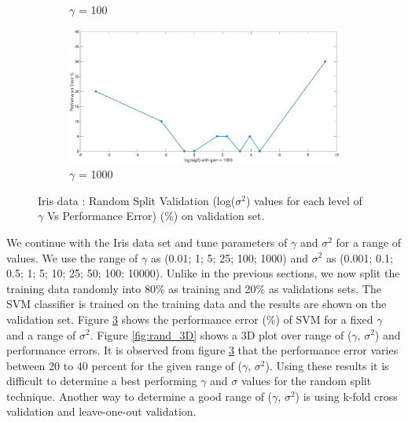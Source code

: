 \documentclass[12pt]{report}
\begin{document}
{\begin{figure}[!ht]
\begin{floatrow}
{\begin{subfigure}{.3\textwidth}
			\caption{$\gamma$ = 100}
			\label{fig:rand_gamma(100)}
		\end{subfigure}%
		\begin{subfigure}{.3\textwidth}
			\includegraphics[height=0.35\linewidth,width=0.7\linewidth]{Ex1.3_gam(1000).eps}
			\caption{$\gamma$ = 1000}
			\label{fig:rand_gamma(1000)}
		\end{subfigure}%
		}{%
			\caption{Iris data : Random Split Validation (log($\sigma^2$) values for each level of $\gamma$ Vs Performance Error)  (\%) on validation set.}\label{fig:rand_gam}
		}
	\end{floatrow}
\end{figure}

We continue with the Iris data set and tune parameters of $\gamma$ and $\sigma^2$ for a range of values. We use the range of $\gamma$ as (0.01; 1; 5; 25; 100; 1000) and $\sigma^2$ as (0.001; 0.1; 0.5; 1; 5; 10; 25; 50; 100; 10000). Unlike in the previous sections, we now split the training data randomly into 80\% as training and 20\% as validations sets. The SVM classifier is trained on the training data and the results are shown on the validation set. Figure \ref{fig:rand_gam}  shows the performance error (\%) of SVM for a fixed $\gamma$ and a range of $\sigma^2$. Figure \ref{fig:rand_3D} shows a 3D plot over range of ($\gamma$, $\sigma^2$) and performance errors. It is observed from figure \ref{fig:rand_gam} that the performance error varies between 20 to 40 percent for the given range of ($\gamma$, $\sigma^2$). Using these results it is difficult to determine a best performing $\gamma$ and $\sigma$ values for the random split technique.  Another way to determine a good range of ($\gamma$, $\sigma^2$) is using k-fold cross validation and leave-one-out validation.

}
\end{document}
